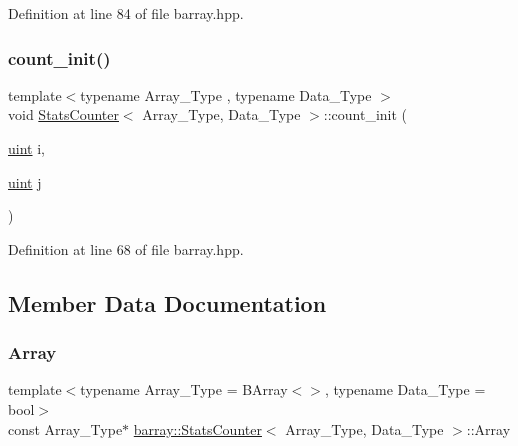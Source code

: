 Definition at line 84 of file barray.\+hpp.

\mbox{\label{classbarray_1_1_stats_counter_a19bd5936619e190c0d8918b4f343922e}} 
\subsubsection{\texorpdfstring{count\+\_\+init()}{count\_init()}}
{\footnotesize\ttfamily template$<$typename Array\+\_\+\+Type , typename Data\+\_\+\+Type $>$ \\
void \hyperlink{classbarray_1_1_stats_counter}{Stats\+Counter}$<$ Array\+\_\+\+Type, Data\+\_\+\+Type $>$\+::count\+\_\+init (\begin{DoxyParamCaption}\item[{\hyperlink{namespacebarray_af9756a31953db233f80a9cfe1ef31c32}{uint}}]{i,  }\item[{\hyperlink{namespacebarray_af9756a31953db233f80a9cfe1ef31c32}{uint}}]{j }\end{DoxyParamCaption})\hspace{0.3cm}{\ttfamily [inline]}}



Definition at line 68 of file barray.\+hpp.



\subsection{Member Data Documentation}
\mbox{\label{classbarray_1_1_stats_counter_ab6b997c20a8da062f364796796f463bf}} 
\subsubsection{\texorpdfstring{Array}{Array}}
{\footnotesize\ttfamily template$<$typename Array\+\_\+\+Type  = B\+Array$<$$>$, typename Data\+\_\+\+Type  = bool$>$ \\
const Array\+\_\+\+Type$\ast$ \hyperlink{classbarray_1_1_stats_counter}{barray\+::\+Stats\+Counter}$<$ Array\+\_\+\+Type, Data\+\_\+\+Type $>$\+::Array}



